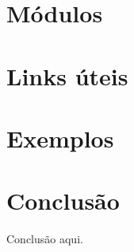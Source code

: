 \documentclass{article}
\begin{document}
\section{Módulos}

\section{Links úteis}
%

\section{Exemplos}



\section{Conclusão}
Conclusão aqui.
\end{document}
